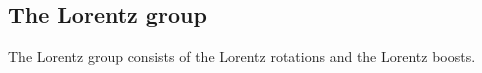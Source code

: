 
\subsection{The Lorentz group}

The Lorentz group consists of the Lorentz rotations and the Lorentz boosts.

